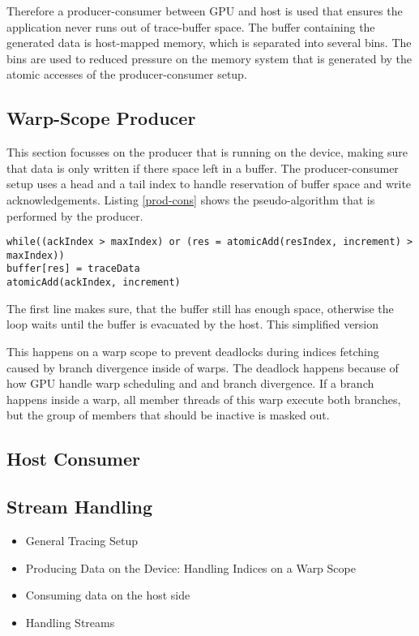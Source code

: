 	Therefore a producer-consumer between GPU and host is used that ensures the application never runs out of trace-buffer space.
	The buffer containing the generated data is host-mapped memory, which is separated into several bins. The bins are used to reduced
	pressure on the memory system that is generated by the atomic accesses of the producer-consumer setup.
	
	\subsection{Warp-Scope Producer}
	This section focusses on the producer that is running on the device, making sure that data is only written if there space left
	in a buffer. The producer-consumer setup uses a head and a tail index to handle reservation of buffer space and write acknowledgements. Listing \ref{prod-cons} shows the pseudo-algorithm that is performed by the producer.
	\begin{lstlisting}[style=perl]
while((ackIndex > maxIndex) or (res = atomicAdd(resIndex, increment) > maxIndex)) 
buffer[res] = traceData
atomicAdd(ackIndex, increment)
	\end{lstlisting}\label{prod-cons}
	The first line makes sure, that the buffer still has enough space, otherwise the loop waits until the buffer is evacuated by the host. This simplified version 
	
	
	This happens on a warp scope to prevent deadlocks during indices fetching caused by branch divergence inside of warps.
	The deadlock happens because of how GPU handle warp scheduling and and branch divergence. If a branch happens inside a warp, all member threads of this warp execute both branches, but the group of members that should be inactive is masked out.
	
	\subsection{Host Consumer}
	\subsection{Stream Handling}
\begin{itemize}
	\item General Tracing Setup
	\item Producing Data on the Device: Handling Indices on a Warp Scope
	\item Consuming data on the host side
	\item Handling Streams
\end{itemize}


